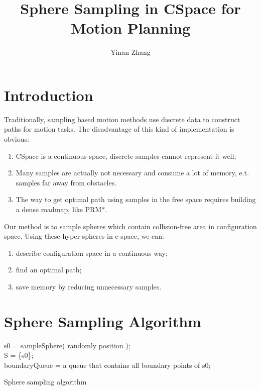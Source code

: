 \documentclass{article}
\title{Sphere Sampling in CSpace for Motion Planning}
\author{Yinan Zhang}
\begin{document}
\maketitle

\section{Introduction}

Traditionally, sampling based motion methods use discrete data to construct paths for motion tasks. The disadvantage of this kind of implementation is obvious: 

\begin{enumerate}
  \item CSpace is a continuous space, discrete samples cannot represent it well;
  \item Many samples are actually not necessary and consume a lot of memory, e.t. samples far away from obstacles.
  \item The way to get optimal path using samples in the free space requires building a dense roadmap, like PRM*.
\end{enumerate}

Our method is to sample spheres which contain collision-free area in configuration space. Using these hyper-spheres in c-space, we can:
\begin{enumerate}
  \item describe configuration space in a continuous way;
  \item find an optimal path;
  \item save memory by reducing unnecessary samples.
\end{enumerate}

\section{Sphere Sampling Algorithm}
\label{Sphere sampling algorithm}
 \begin{algorithm}
 	s0 = sampleSphere( randomly position );\\
 	S = \{s0\}; \\
 	boundaryQueue = a queue that contains all boundary points of s0;\\
 	\caption{ Sphere sampling algorithm }
 \end{algorithm}
\end{document}
